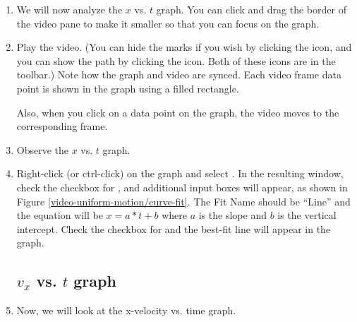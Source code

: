 \begin{enumerate}
	\item We will now analyze the $x$ vs. $t$ graph. You can click and drag the border of the video pane to make it smaller so that you can focus on the graph.
	\item Play the video. (You can hide the marks if you wish by clicking the  icon, and you can show the path by clicking the  icon. Both of these icons are in the toolbar.) Note how the graph and video are synced. Each video frame data point is shown in the graph using a filled rectangle.
	
	Also, when you click on a data point on the graph, the video moves to the corresponding frame.
	
	\item Observe the $x$ vs. $t$ graph.
		
	
	\item  Right-click (or ctrl-click) on the graph and select . In the resulting window, check the checkbox for , and additional input boxes will appear, as shown in Figure \ref{video-uniform-motion/curve-fit}. The Fit Name should be ``Line'' and the equation will be $x=a*t+b$ where $a$ is the slope and $b$ is the vertical intercept. Check the checkbox for  and the best-fit line will appear in the graph.
	
	
	

	
	
\subsection*{$v_x$ vs. $t$ graph}

	
	\item Now, we will look at the x-velocity vs. time graph.
	

\end{enumerate}

